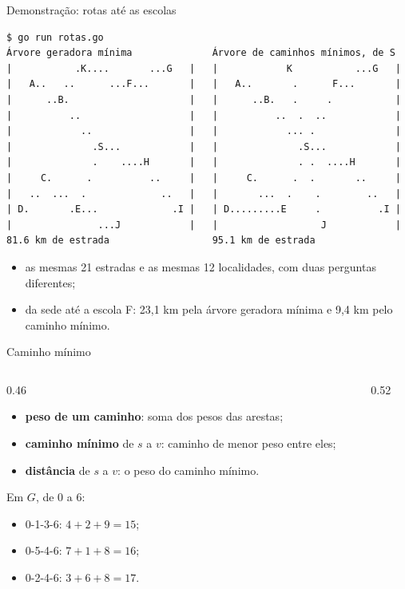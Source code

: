\documentclass{beamer}
\begin{document}
\begin{frame}[fragile]{Demonstração: rotas até as escolas}
	\begin{verbatim}
$ go run rotas.go
Árvore geradora mínima              Árvore de caminhos mínimos, de S
|           .K....       ...G   |   |            K           ...G   |
|   A..   ..      ...F...       |   |   A..       .      F...       |
|      ..B.                     |   |      ..B.   .     .           |
|          ..                   |   |          ..  .  ..            |
|            ..                 |   |            ... .              |
|              .S...            |   |              .S...            |
|              .    ....H       |   |              . .  ....H       |
|     C.      .          ..     |   |     C.      .  .       ..     |
|   ..  ...  .             ..   |   |       ...  .    .        ..   |
| D.       .E...             .I |   | D.........E     .          .I |
|               ...J            |   |                  J            |
81.6 km de estrada                  95.1 km de estrada
\end{verbatim}
	\footnotesize
	\begin{itemize}
		\item as mesmas 21 estradas e as mesmas 12 localidades, com duas perguntas
		      diferentes;
		\item da sede até a escola F: 23,1 km pela árvore geradora mínima e 9,4 km
		      pelo caminho mínimo.
	\end{itemize}
\end{frame}

\begin{frame}{Caminho mínimo}
	\begin{columns}[c]
		\begin{column}{0.46\textwidth}
			\footnotesize
			\begin{itemize}
				\item \textbf{peso de um caminho}: soma dos pesos das arestas;
				\item \textbf{caminho mínimo} de $s$ a $v$: caminho de menor peso entre
				      eles;
				\item \textbf{distância} de $s$ a $v$: o peso do caminho mínimo.
			\end{itemize}
			\vspace{0.2cm}
			Em $G$, de 0 a 6:
			\begin{itemize}
				\item 0-1-3-6: $4 + 2 + 9 = 15$;
				\item 0-5-4-6: $7 + 1 + 8 = 16$;
				\item 0-2-4-6: $3 + 6 + 8 = 17$.
			\end{itemize}
		\end{column}
		\begin{column}{0.52\textwidth}
			\begin{center}
				\scalebox{0.82}{\grafoGP}
			\end{center}
		\end{column}
	\end{columns}
\end{frame}
\end{document}

